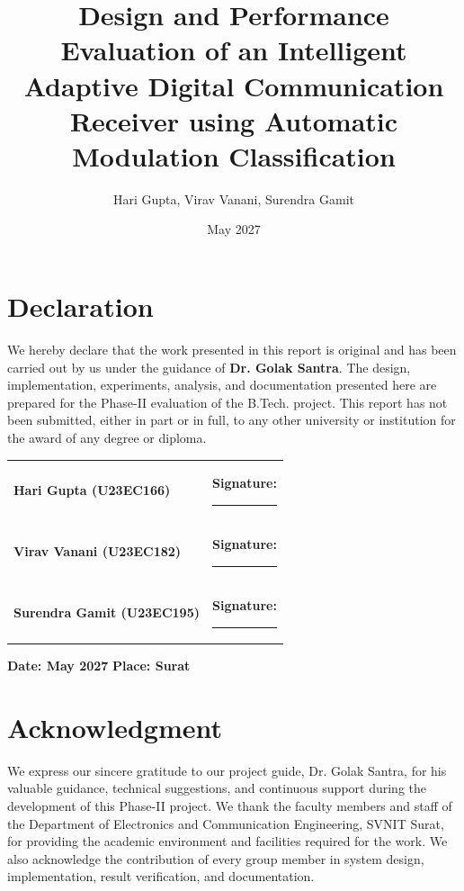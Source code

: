 \documentclass[12pt,twoside,openright]{report}
\begin{document}
\title{Design and Performance Evaluation of an Intelligent Adaptive Digital Communication Receiver using Automatic Modulation Classification}
\author{Hari Gupta, Virav Vanani, Surendra Gamit}
\date{May 2027}

\MakeTitlePage
\MakeCerti
\pagestyle{empty}

\clearemptydoublepage
\chapter*{Declaration}
We hereby declare that the work presented in this report is original and has
been carried out by us under the guidance of \textbf{Dr. Golak Santra}. The
design, implementation, experiments, analysis, and documentation presented
here are prepared for the Phase-II evaluation of the B.Tech. project. This
report has not been submitted, either in part or in full, to any other
university or institution for the award of any degree or diploma.

\vspace{2cm}
\noindent
\begin{tabular}{p{} p{}}
\textbf{Hari Gupta (U23EC166)} & \textbf{Signature:} \rule{4cm}{0.4pt} \\
\textbf{Virav Vanani (U23EC182)} & \textbf{Signature:} \rule{4cm}{0.4pt} \\
\textbf{Surendra Gamit (U23EC195)} & \textbf{Signature:} \rule{4cm}{0.4pt} \\
\end{tabular}

\vspace{1cm}
\noindent
\textbf{Date: May 2027} \hfill \textbf{Place: Surat}

\clearemptydoublepage
\chapter*{Acknowledgment}
We express our sincere gratitude to our project guide, Dr. Golak Santra, for
his valuable guidance, technical suggestions, and continuous support during
the development of this Phase-II project. We thank the faculty members and
staff of the Department of Electronics and Communication Engineering, SVNIT
Surat, for providing the academic environment and facilities required for
the work. We also acknowledge the contribution of every group member in
system design, implementation, result verification, and documentation.
\end{document}
